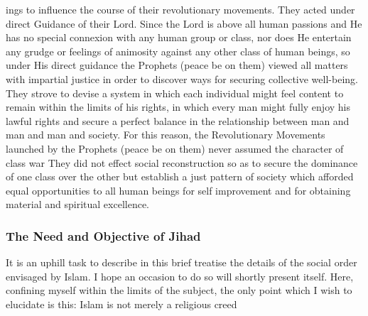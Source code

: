 ings to influence the course of their revolutionary movements. They
acted under direct Guidance of their Lord. Since the Lord is above all
human passions and He has no special connexion with any human group or
class, nor does He entertain any grudge or feelings of animosity against
any other class of human beings, so under His direct guidance the
Prophets (peace be on them) viewed all matters with impartial justice in
order to discover ways for securing collective well-being. They strove
to devise a system in which each individual might feel content to remain
within the limits of his rights, in which every man might fully enjoy
his lawful rights and secure a perfect balance in the relationship
between man and man and man and society. For this reason, the
Revolutionary Movements launched by the Prophets (peace be on them)
never assumed the character of class war They did not effect social
reconstruction so as to secure the dominance of one class over the other
but establish a just pattern of society which afforded equal
opportunities to all human beings for self improvement and for obtaining
material and spiritual excellence.

\hypertarget{the-need-and-objective-of-jihad}{%
\subsubsection{The Need and Objective of
Jihad}\label{the-need-and-objective-of-jihad}}

It is an uphill task to describe in this brief treatise the details of
the social order envisaged by Islam. I hope an occasion to do so will
shortly present itself. Here, confining myself within the limits of the
subject, the only point which I wish to elucidate is this: Islam is not
merely a religious creed

